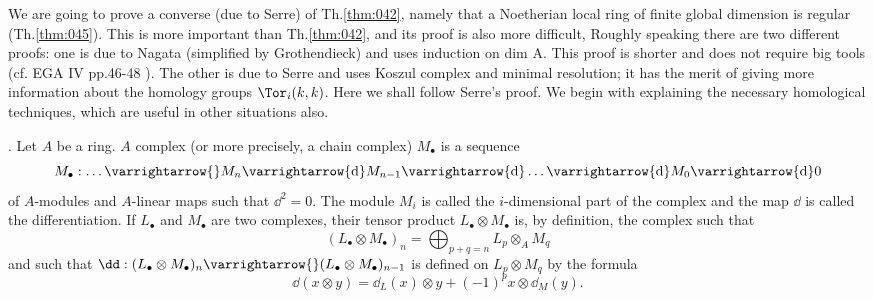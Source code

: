 \documentclass[../main]{subfiles}
\begin{document}
We are going to prove a converse (due to Serre) of Th.\ref{thm:042}, namely that a Noetherian local ring of finite global dimension is regular (Th.\ref{thm:045}). This is more important than Th.\ref{thm:042}, and its proof is also more difficult, Roughly speaking there are two different proofs: one is due to Nagata (simplified by Grothendieck) and uses induction on dim A. This proof is shorter and does not require big tools (cf. EGA IV pp.46-48 \cite{egaIV}). The other is due to Serre and uses Koszul complex and minimal resolution; it has the merit of giving more information about the homology groups $\Tor_{i}(k, k)$. Here we shall follow Serre's proof. We begin with explaining the necessary homological techniques, which are useful in other situations also.

\newparagraph {}. Let $A$ be a ring. $A$ complex (or more precisely, a chain complex) $M_\bullet$ is a sequence
\[
 M_\bullet : \dots \varrightarrow{} M_{n} \varrightarrow{\mathrm{d}} M_{n-1} \varrightarrow{\mathrm{d}} \dots \varrightarrow{\mathrm{d}} M_{0} \varrightarrow{\mathrm{d}} 0
\]
of $A$-modules and $A$-linear maps such that $\dd^{2}=0$. The module $M_i$ is called the $i$-dimensional part of the complex and the map $\dd$ is called the differentiation. If $L_\bullet$ and $M_\bullet$ are two complexes, their tensor product $L_\bullet\otimes M_\bullet$ is, by definition, the complex such that \[(L_\bullet \otimes M_\bullet)_{n}=\displaystyle\bigoplus_{p+q=n} L_{p} \otimes_{A} M_{q}\] and such that $\dd:(L_\bullet \otimes M_\bullet)_{n}\varrightarrow{}(L_\bullet \otimes M_\bullet)_{n-1}$ is defined on $L_{p} \otimes M_{q}$ by the formula \[\dd(x \otimes y)=\dd_{L}(x) \otimes y+(-1)^{p} x \otimes \dd_{M}(y).\]
\end{document}
